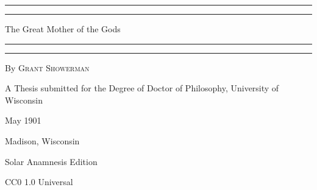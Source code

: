 \documentclass[a4paper, 11pt, oneside, polutonikogreek, english]{article}
\begin{document}
\begin{titlepage} %
	\centering %
	\scshape %

	
	\rule{\textwidth}{1.6pt}\vspace*{-\baselineskip}\vspace*{2pt} %
	\rule{\textwidth}{0.4pt} %
	
	\vspace{0.75\baselineskip} %

        {\LARGE The Great Mother of the Gods \\} %
	
	\vspace{0.75\baselineskip} %
	
	\rule{\textwidth}{0.4pt}\vspace*{-\baselineskip}\vspace{3.2pt} %
	\rule{\textwidth}{1.6pt} %
	
	\vspace{1\baselineskip} %
	
	
	{By \scshape\Large Grant Showerman\\} %
	
	\vspace*{1\baselineskip} %
	
	
	\vspace{1\baselineskip} %

        {\small A Thesis submitted for the Degree of Doctor of Philosophy, University of Wisconsin}

	
	
		
	\vspace*{\fill}%
	
	May 1901  %
	
	{\small Madison, Wisconsin } %

	\vspace{1\baselineskip} %

    {\small Solar Anamnesis Edition}  %
	
	{\small CC0 1.0 Universal} %
\end{titlepage}
\end{document}
